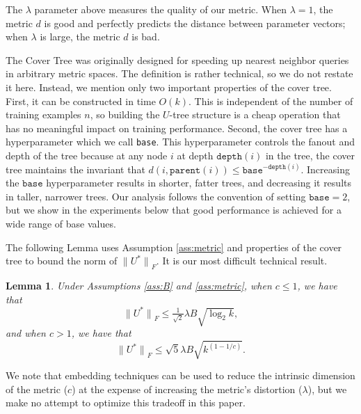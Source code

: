 \documentclass[twoside]{article}
\newtheorem{lemma}{Lemma}
\newcommand{\parent}[1]{\texttt{parent}({#1})}
\renewcommand{\star}[1]{{#1}^{*}}
\newcommand{\lF}[1]{{\lVert {#1} \rVert}_F}
\newcommand{\depth}[1]{\texttt{depth}({#1})}
\begin{document}
The $\lambda$ parameter above measures the quality of our metric.
When $\lambda=1$, the metric $d$ is good and perfectly predicts the distance between parameter vectors;
when $\lambda$ is large, the metric $d$ is bad.

The Cover Tree was originally designed for speeding up nearest neighbor queries in arbitrary metric spaces.
The definition is rather technical, so we do not restate it here.
Instead, we mention only two important properties of the cover tree.
First, it can be constructed in time $O(k)$.
This is independent of the number of training examples $n$,
so building the $U$-tree structure is a cheap operation that has no meaningful impact on training performance.
Second, the cover tree has a hyperparameter which we call \texttt{base}.
This hyperparameter controls the fanout and depth of the tree because at any node $i$ at depth $\depth{i}$ in the tree,
the cover tree maintains the invariant that $d(i, \parent{i}) \le \texttt{base}^{-\depth{i}}$.
Increasing the $\texttt{base}$ hyperparameter results in shorter, fatter trees,
and decreasing it results in taller, narrower trees.
Our analysis follows the convention of setting $\texttt{base}=2$,
but we show in the experiments below that good performance is achieved for a wide range of base values.

The following Lemma uses Assumption \ref{ass:metric} and properties of the cover tree to bound the norm of $\lF{\star U}$.
It is our most difficult technical result.
\begin{lemma}
    \label{lemma:main}
    Under Assumptions \ref{ass:B} and \ref{ass:metric},
    when $c\le1$, we have that
    \begin{equation}
        \lF{\star U} \le \tfrac{1}{\sqrt2}\lambda B \sqrt{\log_2 k},
        \label{eq:c<=1}
    \end{equation}
    and when $c>1$, we have that
    \begin{equation}
        \lF{\star U} \le \sqrt{5}\lambda B \sqrt{k^{(1-1/c)}}.
        \label{eq:c>1}
    \end{equation}
\end{lemma}

We note that embedding techniques can be used to reduce the intrinsic dimension of the metric ($c$) at the expense of increasing the metric's distortion ($\lambda$),
but we make no attempt to optimize this tradeoff in this paper.
\end{document}
